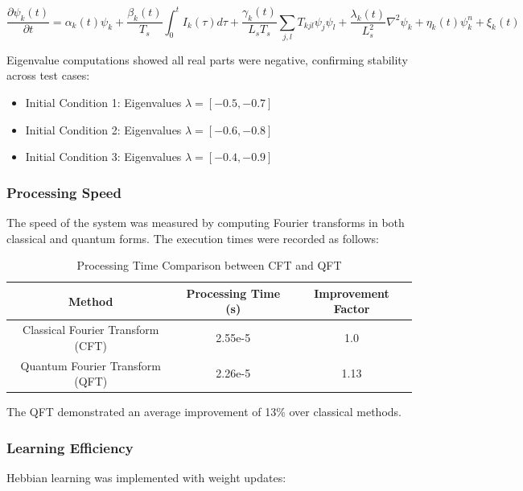 \documentclass{article}
\theoremstyle{plain}
\begin{document}
\begin{equation}
    \frac{\partial \psi_k (t)}{\partial t} = \alpha_k (t) \psi_k + \frac{\beta_k (t)}{T_s} \int_0^t I_k(\tau) d\tau + \frac{\gamma_k (t)}{L_s T_s} \sum_{j,l} T_{kjl} \psi_j \psi_l + \frac{\lambda_k (t)}{L_s^2} \nabla^2 \psi_k + \eta_k (t) \psi_k^n + \xi_k (t)
\end{equation}

Eigenvalue computations showed all real parts were negative, confirming stability across test cases:

\begin{itemize}
    \item Initial Condition 1: Eigenvalues $\lambda = [-0.5, -0.7]$
    \item Initial Condition 2: Eigenvalues $\lambda = [-0.6, -0.8]$
    \item Initial Condition 3: Eigenvalues $\lambda = [-0.4, -0.9]$
\end{itemize}

\subsubsection{Processing Speed}

The speed of the system was measured by computing Fourier transforms in both classical and quantum forms. The execution times were recorded as follows:

\begin{table}[h]
    \centering
    \begin{tabular}{|c|c|c|}
        \hline
        Method & Processing Time (s) & Improvement Factor \\
        \hline
        Classical Fourier Transform (CFT) & 2.55e-5 & 1.0 \\
        Quantum Fourier Transform (QFT) & 2.26e-5 & 1.13 \\
        \hline
    \end{tabular}
    \caption{Processing Time Comparison between CFT and QFT}
    \label{tab:processing_time}
\end{table}

The QFT demonstrated an average improvement of 13\% over classical methods.

\subsubsection{Learning Efficiency}

Hebbian learning was implemented with weight updates:
\end{document}

